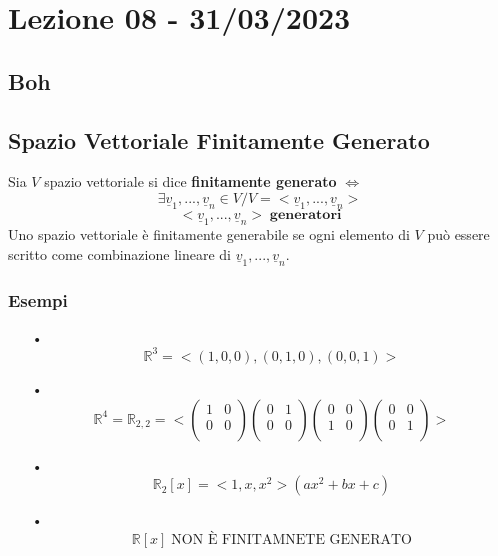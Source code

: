 \section{Lezione 08 - 31/03/2023}

\subsection{Boh}
\blindtext

\subsection{Spazio Vettoriale Finitamente Generato}
Sia $V$ spazio vettoriale si dice \textbf{finitamente generato} $ \Leftrightarrow $
$$ \exists \underline{v}_1,...,\underline{v}_n \in V / V = <\underline{v}_1,...,\underline{v}_n> $$
$$ <\underline{v}_1,...,\underline{v}_n> \; \textbf{generatori} $$
Uno spazio vettoriale è finitamente generabile se ogni
elemento di $V$ può essere scritto come combinazione lineare di $\underline{v}_1,...,\underline{v}_n$.\\

\subsubsection{Esempi}
\begin{itemize}
\item[•] $$ \mathbb{R}^3 = < (1,0,0),(0,1,0),(0,0,1) > $$
\item[•] $$ \mathbb{R}^4 = \mathbb{R}_{2,2} = < \begin{pmatrix}
1 & 0 \\
0 & 0 \\
\end{pmatrix}
\begin{pmatrix}
0 & 1 \\
0 & 0 \\
\end{pmatrix}
\begin{pmatrix}
0 & 0 \\
1 & 0 \\
\end{pmatrix}
\begin{pmatrix}
0 & 0 \\
0 & 1 \\
\end{pmatrix} >  $$
\item[•] $$ \mathbb{R}_2[x] = <1,x,x^2> (ax^2+bx+c)$$
\item[•] $$ \mathbb{R}[x] \; \text{NON È FINITAMNETE GENERATO}$$

\end{itemize}

